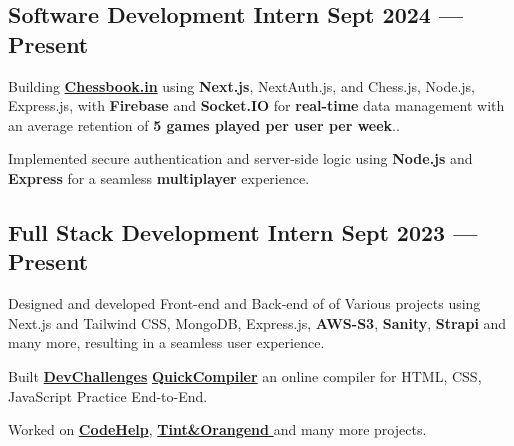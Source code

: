 \subsection{{Software Development Intern \hfill Sept 2024 --- Present}}
\begin{zitemize}
\item  Building  \href{https://www.chessbook.in/}{\textbf{Chessbook.in}}  using \textbf{Next.js}, 
 NextAuth.js, and Chess.js, Node.js, Express.js, with \textbf{Firebase} and \textbf{Socket.IO} for\textbf{ real-time} data management with an average  retention of \textbf{5 games played per user per week}..
\item Implemented secure authentication and server-side logic using \textbf{Node.js} and \textbf{Express} for a seamless \textbf{multiplayer} experience.
\end{zitemize}

\subsection{{Full Stack Development Intern \hfill Sept 2023 --- Present}}
\begin{zitemize}
\item Designed and developed Front-end and Back-end of of Various projects using Next.js and Tailwind CSS, MongoDB,
Express.js,\textbf{  AWS-S3},\textbf{ Sanity}, \textbf{Strapi} and many more, resulting in a seamless user experience.
\item Built \href{https://www.codehelp.in/devchallenge/dashboard}{\textbf{DevChallenges}} \href{https://www.codehelp.in/devchallenge/dashboard}{\textbf{QuickCompiler}} an online compiler for HTML, CSS, JavaScript Practice End-to-End.
\item  Worked on \href{https://www.codehelp.in/}{\textbf{CodeHelp}}, \href{https://ppf-guide.tintandorange.com/}{\textbf{Tint&Orangend }} and many more projects.
\end{zitemize}


